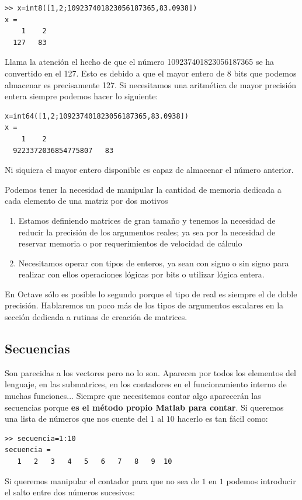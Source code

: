 \begin{verbatim}
>> x=int8([1,2;109237401823056187365,83.0938])
x =
    1    2
  127   83
\end{verbatim}
Llama la atención el hecho de que el número 109237401823056187365 se
ha convertido en el 127. Esto es debido a que el mayor entero de 8
bits que podemos almacenar es precisamente 127. Si necesitamos una
aritmética de mayor precisión entera siempre podemos hacer lo
siguiente:

\begin{verbatim}
x=int64([1,2;109237401823056187365,83.0938])
x =
    1    2
  9223372036854775807   83
\end{verbatim}
Ni siquiera el mayor entero disponible es capaz de almacenar el número
anterior.
 
Podemos tener la necesidad de manipular la cantidad de memoria
dedicada a cada elemento de una matriz por dos motivos

\begin{enumerate}
\item Estamos definiendo matrices de gran tamaño y tenemos la
  necesidad de reducir la precisión de los argumentos reales; ya sea
  por la necesidad de reservar memoria o por requerimientos de
  velocidad de cálculo
\item Necesitamos operar con tipos de enteros, ya sean con signo o sin
  signo para realizar con ellos operaciones lógicas por bits o utilizar
  lógica entera.
\end{enumerate}
En Octave sólo es posible lo segundo porque el tipo de real es siempre
el de doble precisión. Hablaremos un poco más de los tipos de
argumentos escalares en la sección dedicada a rutinas de creación de
matrices.


\subsection{Secuencias\label{sub:Secuencias}}

Son parecidas a los vectores pero no lo son. Aparecen por todos los
elementos del lenguaje, en las submatrices, en los contadores en el
funcionamiento interno de muchas funciones... Siempre que necesitemos
contar algo aparecerán las secuencias porque \textbf{es el método
  propio Matlab para contar}. Si queremos una lista de números que nos
cuente del $1$ al $10$ hacerlo es tan fácil como:

\begin{verbatim}
>> secuencia=1:10
secuencia =
   1   2   3   4   5   6   7   8   9  10
\end{verbatim}
Si queremos manipular el contador para que no sea de $1$ en $1$
podemos introducir el salto entre dos números sucesivos:

